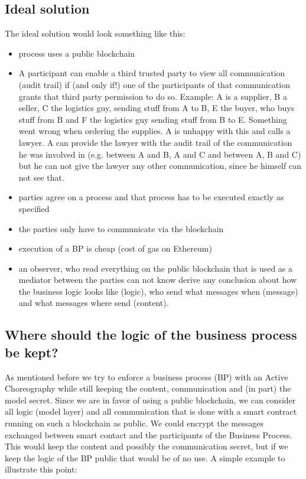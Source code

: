 \documentclass[runningheads]{llncs}
\begin{document}
\subsection{Ideal solution}
The ideal solution would look something like this: 
\begin{itemize}
    \item process uses a public blockchain
    \item A participant can enable a third trusted party to view all communication (audit trail) if (and only if!) one of the participants of that communication grants that third party permission to do so. Example: A is a supplier, B a seller, C the logistics guy, sending stuff from A to B, E the buyer, who buys stuff from B and F the logistics guy sending stuff from B to E. Something went wrong when ordering the supplies. A is unhappy with this and calls a lawyer. A can provide the lawyer with the audit trail of the communication he was involved in (e.g. between A and B, A and C and between A, B and C) but he can not give the lawyer any other communication, since he himself can not see that.
    \item parties agree on a process and that process has to be executed exactly as specified
    \item the parties only have to communicate via the blockchain
    \item execution of a BP is cheap (cost of gas on Ethereum)
    \item an observer, who read everything on the public blockchain that is used as a mediator between the parties can not know derive any conclusion about how the business logic looks like (logic), who send what messages when (message) and what messages where send (content).
\end{itemize}


\subsection{Where should the logic of the business process be kept?}

As mentioned before we try to enforce a business process (BP) with an Active Choreography while still keeping the content, communication and (in part) the model secret. Since we are in favor of using a public blockchain, we can consider all logic (model layer) and all communication that is done with a smart contract running on such a blockchain as public. We could encrypt the messages exchanged between smart contact and the participants of the Business Process. This would keep the content and possibly the communication secret, but if we keep the logic of the BP public that would be of no use. A simple example to illustrate this point:
\end{document}
